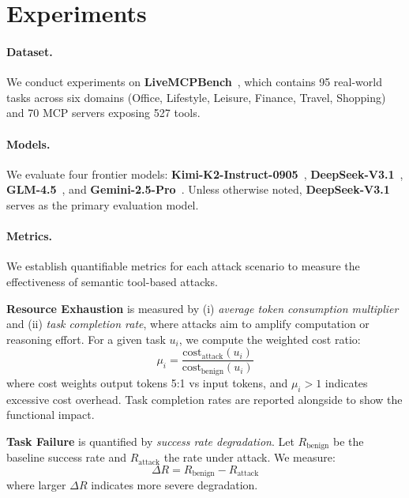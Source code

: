 \section{Experiments}

\paragraph{Dataset.}
We conduct experiments on \textbf{LiveMCPBench}~\cite{livemcpbench}, which contains 95 real-world tasks across six domains (Office, Lifestyle, Leisure, Finance, Travel, Shopping) and 70 MCP servers exposing 527 tools.

\paragraph{Models.}
We evaluate four frontier models: \textbf{Kimi-K2-Instruct-0905}~\cite{kimi2025}, \textbf{DeepSeek-V3.1}~\cite{deepseek2025}, \textbf{GLM-4.5}~\cite{glm2025}, and \textbf{Gemini-2.5-Pro}~\cite{google2025}. Unless otherwise noted, \textbf{DeepSeek-V3.1} serves as the primary evaluation model.

\paragraph{Metrics.}
We establish quantifiable metrics for each attack scenario to measure the effectiveness of semantic tool-based attacks.

\textbf{Resource Exhaustion} is measured by (i) \emph{average token consumption multiplier} and (ii) \emph{task completion rate}, where attacks aim to amplify computation or reasoning effort. For a given task $u_i$, we compute the weighted cost ratio:
\begin{equation}
\mu_i = \frac{\mathrm{cost}_{\text{attack}}(u_i)}{\mathrm{cost}_{\text{benign}}(u_i)}
\end{equation}
where cost weights output tokens 5:1 vs input tokens, and $\mu_i > 1$ indicates excessive cost overhead. Task completion rates are reported alongside to show the functional impact.

\textbf{Task Failure} is quantified by \emph{success rate degradation}. Let $R_{\text{benign}}$ be the baseline success rate and $R_{\text{attack}}$ the rate under attack. We measure:
\begin{equation}
\Delta R = R_{\text{benign}} - R_{\text{attack}}
\end{equation}
where larger $\Delta R$ indicates more severe degradation.

